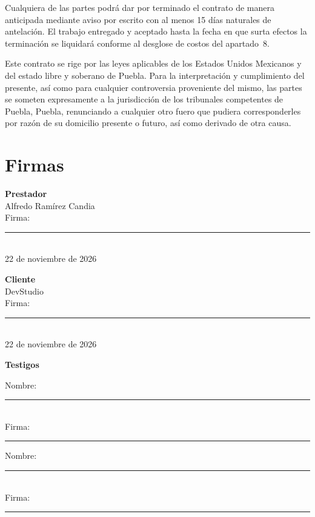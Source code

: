 Cualquiera de las partes podrá dar por terminado el contrato de manera
anticipada mediante aviso por escrito con al menos 15 días naturales de
antelación. El trabajo entregado y aceptado hasta la fecha en que surta
efectos la terminación se liquidará conforme al desglose de costos del
apartado~8.

Este contrato se rige por las leyes aplicables de los Estados Unidos Mexicanos
y del estado libre y soberano de Puebla. Para la interpretación y cumplimiento
del presente, así como para cualquier controversia proveniente del mismo, las
partes se someten expresamente a la jurisdicción de los tribunales competentes
de Puebla, Puebla, renunciando a cualquier otro fuero que pudiera
corresponderles por razón de su domicilio presente o futuro, así como
derivado de otra causa.

\section{Firmas}

\vspace{1.1cm}
\noindent
\begin{minipage}[t]{0.47\textwidth}
  \textbf{Prestador}\\[1.5cm]
  Alfredo Ramírez Candia\\[0.8cm]
  Firma: \rule{3cm}{0.4pt}\\[0.6cm]
  22 de noviembre de 2026
\end{minipage}\hfill
\begin{minipage}[t]{0.47\textwidth}
  \textbf{Cliente}\\[1.5cm]
  DevStudio\\[0.8cm]
  Firma: \rule{3cm}{0.4pt}\\[0.6cm]
  22 de noviembre de 2026
\end{minipage}

\vspace{1.3cm}
\noindent\textbf{Testigos}

\vspace{0.8cm}
\noindent
\begin{minipage}[t]{0.47\textwidth}
  Nombre: \rule{3cm}{0.4pt}\\[0.8cm]
  Firma: \rule{3cm}{0.4pt}
\end{minipage}\hfill
\begin{minipage}[t]{0.47\textwidth}
  Nombre: \rule{3cm}{0.4pt}\\[0.8cm]
  Firma: \rule{3cm}{0.4pt}
\end{minipage}


